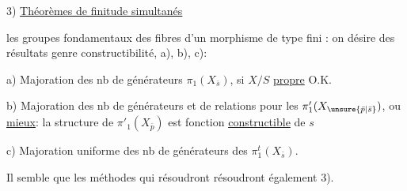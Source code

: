 3) \uline{Théorèmes de finitude simultanés}

 les groupes fondamentaux des fibres  d'un morphisme de type fini : on désire des résultats genre constructibilité,  a), b), c):

a) Majoration  des nb de générateurs  $\pi_1(X_{\bar s})$, si $X/S$ \uline{propre} O.K.


b) Majoration  des nb de générateurs et de relations pour les $\pi'_1(X_{\unsure{\bar p|\bar s}})$, ou \uline{mieux}: la structure de $\pi'_1(X_{\bar p})$ est fonction \uline{constructible} de $s$

c) Majoration uniforme des nb de générateurs des $\pi_1^t(X_{\bar s})$.

Il semble que les méthodes qui résoudront  résoudront également 3).
